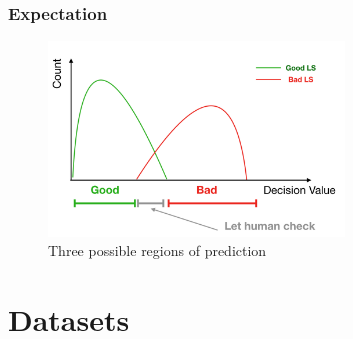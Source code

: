 \documentclass{beamer}
\begin{document}

\begin{frame}
\frametitle{Expectation}
\begin{figure}
    \includegraphics[height=0.7\textheight, width=0.7\textwidth]{images/expected_greyzone}
    \caption{Three possible regions of prediction}
\end{figure}
\end{frame}

\section{Datasets} %
\subsection{}
\end{document}
